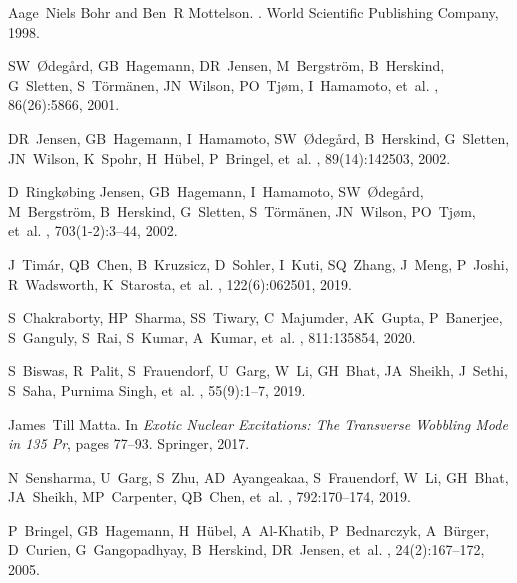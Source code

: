 \documentclass[myclassdoc,debug]{rjparticle}
\begin{document}
\begin{thebibliography}{99}

Aage~Niels Bohr and Ben~R Mottelson.
.
\newblock World Scientific Publishing Company, 1998.

SW~{\O}deg{\aa}rd, GB~Hagemann, DR~Jensen, M~Bergstr{\"o}m, B~Herskind,
  G~Sletten, S~T{\"o}rm{\"a}nen, JN~Wilson, PO~Tj{\o}m, I~Hamamoto, et~al.
, 86(26):5866, 2001.

DR~Jensen, GB~Hagemann, I~Hamamoto, SW~{\O}deg{\aa}rd, B~Herskind, G~Sletten,
  JN~Wilson, K~Spohr, H~H{\"u}bel, P~Bringel, et~al.
, 89(14):142503, 2002.

D~Ringk{\o}bing Jensen, GB~Hagemann, I~Hamamoto, SW~{\O}deg{\aa}rd,
  M~Bergstr{\"o}m, B~Herskind, G~Sletten, S~T{\"o}rm{\"a}nen, JN~Wilson,
  PO~Tj{\o}m, et~al.
, 703(1-2):3--44, 2002.

J~Tim{\'a}r, QB~Chen, B~Kruzsicz, D~Sohler, I~Kuti, SQ~Zhang, J~Meng, P~Joshi,
  R~Wadsworth, K~Starosta, et~al.
, 122(6):062501, 2019.

S~Chakraborty, HP~Sharma, SS~Tiwary, C~Majumder, AK~Gupta, P~Banerjee,
  S~Ganguly, S~Rai, S~Kumar, A~Kumar, et~al.
, 811:135854, 2020.

S~Biswas, R~Palit, S~Frauendorf, U~Garg, W~Li, GH~Bhat, JA~Sheikh, J~Sethi,
  S~Saha, Purnima Singh, et~al.
, 55(9):1--7, 2019.

James~Till Matta.
\newblock In {\em Exotic Nuclear Excitations: The Transverse Wobbling Mode in
  135 Pr}, pages 77--93. Springer, 2017.

N~Sensharma, U~Garg, S~Zhu, AD~Ayangeakaa, S~Frauendorf, W~Li, GH~Bhat,
  JA~Sheikh, MP~Carpenter, QB~Chen, et~al.
, 792:170--174, 2019.

P~Bringel, GB~Hagemann, H~H{\"u}bel, A~Al-Khatib, P~Bednarczyk, A~B{\"u}rger,
  D~Curien, G~Gangopadhyay, B~Herskind, DR~Jensen, et~al.
,
  24(2):167--172, 2005.


\end{thebibliography}
\end{document}
